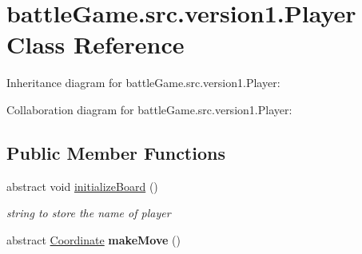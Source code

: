 \hypertarget{classbattleGame_1_1src_1_1version1_1_1Player}{}\section{battle\+Game.\+src.\+version1.\+Player Class Reference}
\label{classbattleGame_1_1src_1_1version1_1_1Player}


Inheritance diagram for battle\+Game.\+src.\+version1.\+Player\+:


Collaboration diagram for battle\+Game.\+src.\+version1.\+Player\+:
\subsection*{Public Member Functions}
\begin{DoxyCompactItemize}
\item 
abstract void \hyperlink{classbattleGame_1_1src_1_1version1_1_1Player_a3e61a162767fc7f564ad8e2ba88f3dd0}{initialize\+Board} ()\hypertarget{classbattleGame_1_1src_1_1version1_1_1Player_a3e61a162767fc7f564ad8e2ba88f3dd0}{}\label{classbattleGame_1_1src_1_1version1_1_1Player_a3e61a162767fc7f564ad8e2ba88f3dd0}

\begin{DoxyCompactList}\small\item\em string to store the name of player \end{DoxyCompactList}\item 
abstract \hyperlink{classbattleGame_1_1src_1_1version1_1_1Coordinate}{Coordinate} {\bfseries make\+Move} ()\hypertarget{classbattleGame_1_1src_1_1version1_1_1Player_a66846194ac59119c6655347836dc6784}{}\label{classbattleGame_1_1src_1_1version1_1_1Player_a66846194ac59119c6655347836dc6784}


\end{DoxyCompactItemize}
